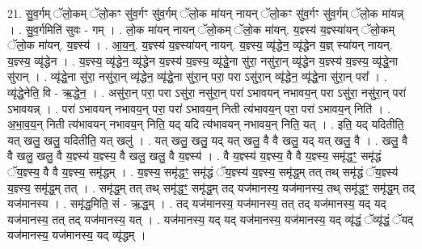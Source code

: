 \documentclass[17pt]{extarticle}
\begin{document}
21. सु॒व॒र्गम् ॅलो॒कम् ॅलो॒कꣳ सु॑व॒र्गꣳ सु॑व॒र्गम् ॅलो॒क मा॑यन् नायन् ॅलो॒कꣳ सु॑व॒र्गꣳ सु॑व॒र्गम् ॅलो॒क मा॑यन्न् । . सु॒व॒र्गमिति॑ सुवः - गम् । . लो॒क मा॑यन् नायन् ॅलो॒कम् ॅलो॒क मा॑यन्. य॒ज्ञ्स्य॑ य॒ज्ञ्स्या॑यन् ॅलो॒कम् ॅलो॒क मा॑यन्. य॒ज्ञ्स्य॑ । . आ॒य॒न्॒. य॒ज्ञ्स्य॑ य॒ज्ञ्स्या॑यन् नायन्. य॒ज्ञ्स्य॒ व्यृ॑द्धेन॒ व्यृ॑द्धेन य॒ज्ञ् स्या॑यन् नायन्. य॒ज्ञ्स्य॒ व्यृ॑द्धेन । . य॒ज्ञ्स्य॒ व्यृ॑द्धेन॒ व्यृ॑द्धेन य॒ज्ञ्स्य॑ य॒ज्ञ्स्य॒ व्यृ॑द्धे॒ना सु॑रा॒ नसु॑रा॒न् व्यृ॑द्धेन य॒ज्ञ्स्य॑ य॒ज्ञ्स्य॒ व्यृ॑द्धे॒ना सु॑रान् । . व्यृ॑द्धे॒ना सु॑रा॒ नसु॑रा॒न् व्यृ॑द्धेन॒ व्यृ॑द्धे॒ना सु॑रा॒न् परा॒ परा ऽसु॑रा॒न् व्यृ॑द्धेन॒ व्यृ॑द्धे॒ना सु॑रा॒न् परा᳚ । . व्यृ॑द्धे॒नेति॒ वि - ऋ॒द्धे॒न॒ । . असु॑रा॒न् परा॒ परा ऽसु॑रा॒ नसु॑रा॒न् परा॑ ऽभावयन् नभावय॒न् परा ऽसु॑रा॒ नसु॑रा॒न् परा॑ ऽभावयन्न् । . परा॑ ऽभावयन् नभावय॒न् परा॒ परा॑ ऽभावय॒न् निती त्य॑भावय॒न् परा॒ परा॑ ऽभावय॒न् निति॑ । . अ॒भा॒व॒य॒न् निती त्य॑भावयन् नभावय॒न् निति॒ यद् यदि त्य॑भावयन् नभावय॒न् निति॒ यत् । . इति॒ यद् यदितीति॒ यत् खलु॒ खलु॒ यदितीति॒ यत् खलु॑ । . यत् खलु॒ खलु॒ यद् यत् खलु॒ वै वै खलु॒ यद् यत् खलु॒ वै । . खलु॒ वै वै खलु॒ खलु॒ वै य॒ज्ञ्स्य॑ य॒ज्ञ्स्य॒ वै खलु॒ खलु॒ वै य॒ज्ञ्स्य॑ । . वै य॒ज्ञ्स्य॑ य॒ज्ञ्स्य॒ वै वै य॒ज्ञ्स्य॒ समृ॑द्धꣳ॒॒ समृ॑द्धं ॅय॒ज्ञ्स्य॒ वै वै य॒ज्ञ्स्य॒ समृ॑द्धम् । . य॒ज्ञ्स्य॒ समृ॑द्धꣳ॒॒ समृ॑द्धं ॅय॒ज्ञ्स्य॑ य॒ज्ञ्स्य॒ समृ॑द्ध॒म् तत् तथ् समृ॑द्धं ॅय॒ज्ञ्स्य॑ य॒ज्ञ्स्य॒ समृ॑द्ध॒म् तत् । . समृ॑द्ध॒म् तत् तथ् समृ॑द्धꣳ॒॒ समृ॑द्ध॒म् तद् यज॑मानस्य॒ यज॑मानस्य॒ तथ् समृ॑द्धꣳ॒॒ समृ॑द्ध॒म् तद् यज॑मानस्य । . समृ॑द्ध॒मिति॒ सं - ऋ॒द्ध॒म् । . तद् यज॑मानस्य॒ यज॑मानस्य॒ तत् तद् यज॑मानस्य॒ यद् यद् यज॑मानस्य॒ तत् तद् यज॑मानस्य॒ यत् । . यज॑मानस्य॒ यद् यद् यज॑मानस्य॒ यज॑मानस्य॒ यद् व्यृ॑द्धं॒ ॅव्यृ॑द्धं॒ ॅयद् यज॑मानस्य॒ यज॑मानस्य॒ यद् व्यृ॑द्धम् । \newline
\end{document}
